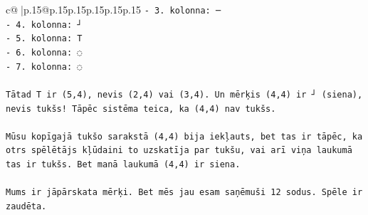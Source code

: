 \documentclass{article}
\begin{document}
{\begin{supertabular}{c@{$\;$}|p{.15\linewidth}@{}p{.15\linewidth}p{.15\linewidth}p{.15\linewidth}p{.15\linewidth}p{.15\linewidth}}
{{{\texttt{{-} 3. kolonna: ─} \\
\texttt{{-} 4. kolonna: ┘} \\
\texttt{{-} 5. kolonna: T} \\
\texttt{{-} 6. kolonna: ◌} \\
\texttt{{-} 7. kolonna: ◌} \\
\\ 
\texttt{Tātad T ir (5,4), nevis (2,4) vai (3,4). Un mērķis (4,4) ir ┘ (siena), nevis tukšs! Tāpēc sistēma teica, ka (4,4) nav tukšs. } \\
\\ 
\texttt{Mūsu kopīgajā tukšo sarakstā (4,4) bija iekļauts, bet tas ir tāpēc, ka otrs spēlētājs kļūdaini to uzskatīja par tukšu, vai arī viņa laukumā tas ir tukšs. Bet manā laukumā (4,4) ir siena.} \\
\\ 
\texttt{Mums ir jāpārskata mērķi. Bet mēs jau esam saņēmuši 12 sodus. Spēle ir zaudēta.} \\
            }
        }
    }
     \\ \\


\end{supertabular}}
\end{document}

